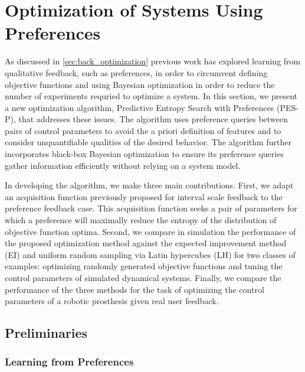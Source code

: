 \section{Optimization of Systems Using
Preferences}\label{sec:completed_pref_opt}

As discussed in \cref{sec:back_optimization} previous work has explored learning
from qualitative feedback, such as preferences, in order to circumvent defining
objective functions and using Bayesian optimization in order to reduce the
number of experiments requried to optimize a system. In this section, we present
a new optimization algorithm, Predictive Entropy Search with Preferences
(PES-P), that addresses these issues. The algorithm uses preference queries
between pairs of control parameters to avoid the a priori definition of features
and to consider unquantifiable qualities of the desired behavior. The algorithm
further incorporates black-box Bayesian optimization to ensure its preference
queries gather information efficiently without relying on a system model.

In developing the algorithm, we make three main contributions. First, we adapt
an acquisition function previously proposed for interval scale feedback to the
preference feedback case. This acquisition function seeks a pair of parameters
for which a preference will maximally reduce the entropy of the distribution of
objective function optima. Second, we compare in simulation the performance of
the proposed optimization method against the expected improvement method (EI)
and uniform random sampling via Latin hypercubes (LH) for two classes of
examples: optimizing randomly generated objective functions and tuning the
control parameters of simulated dynamical systems.  Finally, we compare the
performance of the three methods for the task of optimizing the control
parameters of a robotic prosthesis given real user feedback.

\subsection{Preliminaries} 
\subsubsection{Learning from Preferences}

